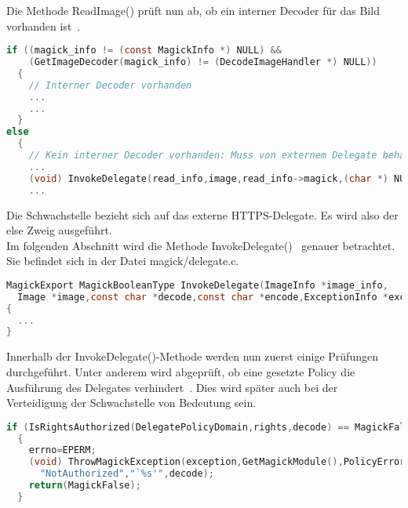 Die Methode ReadImage() prüft nun ab, ob ein interner Decoder für das Bild vorhanden ist~\cite{ReadImageCheckInternal}.

\begin{lstlisting}[firstnumber=486, language=C, caption=magick/constitue.c Aufruf InvokeDelegate(),label={lst:}]
if ((magick_info != (const MagickInfo *) NULL) &&
    (GetImageDecoder(magick_info) != (DecodeImageHandler *) NULL))
  {
    // Interner Decoder vorhanden
    ...
    ...
  }
else
  {
    // Kein interner Decoder vorhanden: Muss von externem Delegate behandelt werden
    ...
    (void) InvokeDelegate(read_info,image,read_info->magick,(char *) NULL, exception);
    ...
\end{lstlisting}
\vspace{5mm}

Die Schwachstelle bezieht sich auf das externe HTTPS-Delegate.
Es wird also der else Zweig ausgeführt.\\

Im folgenden Abschnitt wird die Methode InvokeDelegate()~\cite{DeklarationInvokeDelegate} genauer betrachtet.
Sie befindet sich in der Datei magick/delegate.c.

\begin{lstlisting}[firstnumber=1097, language=C, caption=magick/delegate.c InvokeDelegate(),label={lst:lstlisting}]
MagickExport MagickBooleanType InvokeDelegate(ImageInfo *image_info,
  Image *image,const char *decode,const char *encode,ExceptionInfo *exception)
{
  ...
}
\end{lstlisting}
\vspace{5mm}

\newpage

Innerhalb der InvokeDelegate()-Methode werden nun zuerst einige Prüfungen durchgeführt.
Unter anderem wird abgeprüft, ob eine gesetzte Policy die Ausführung des Delegates verhindert~\cite{IsRightsAuthorized}.
Dies wird später auch bei der Verteidigung der Schwachstelle von Bedeutung sein.

\begin{lstlisting}[firstnumber=1129, language=C, caption=magick/delegates.c InvokeDelegate() Policy-Überprüfung,label={lst:delegatepolicy}]
if (IsRightsAuthorized(DelegatePolicyDomain,rights,decode) == MagickFalse)
  {
    errno=EPERM;
    (void) ThrowMagickException(exception,GetMagickModule(),PolicyError,
      "NotAuthorized","`%s'",decode);
    return(MagickFalse);
  }
\end{lstlisting}
\vspace{5mm}


